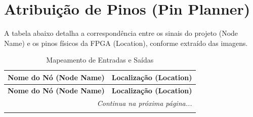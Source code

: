 \documentclass[12pt,a4paper]{article}
\begin{document}
\section{Atribuição de Pinos (Pin Planner)}

A tabela abaixo detalha a correspondência entre os sinais do projeto (Node Name) e os pinos físicos da FPGA (Location), conforme extraído das imagens.

\begin{longtable}{ll}
\caption{Mapeamento de Entradas e Saídas} \\
\toprule
\textbf{Nome do Nó (Node Name)} & \textbf{Localização (Location)} \\
\midrule
\endfirsthead

\toprule
\textbf{Nome do Nó (Node Name)} & \textbf{Localização (Location)} \\
\midrule
\endhead

\midrule
\multicolumn{2}{r}{\textit{Continua na próxima página...}} \\
\bottomrule
\endfoot

\bottomrule
\endlastfoot


\end{longtable}
\end{document}
